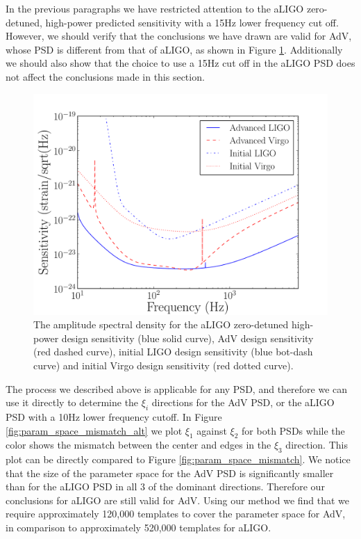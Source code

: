 In the previous paragraphs we have restricted attention to the aLIGO
zero-detuned, high-power predicted sensitivity with a 15Hz lower frequency cut off. However,
we should verify that the conclusions we have drawn are valid for AdV, whose
PSD is different from that of aLIGO, as shown in Figure \ref{fig:asd_comparison}. Additionally we
should also show that the choice to use a 15Hz cut off in the aLIGO PSD does not affect
the conclusions made in this section. 
\begin{figure}
\begin{center}
\includegraphics[width=1.0\textwidth]{papers/bns_spin/figure6.pdf}
\end{center}
\caption{\label{fig:asd_comparison} The amplitude spectral density for the aLIGO
zero-detuned high-power design sensitivity (blue solid curve), AdV design sensitivity
(red dashed curve), initial LIGO design sensitivity (blue bot-dash curve) and initial
Virgo design sensitivity (red dotted curve).}
\end{figure}


The process we described above is applicable for any PSD, and therefore we can use it directly
to determine the $\xi_i$ directions for the AdV PSD, or the aLIGO PSD with
a 10Hz lower frequency cutoff. In Figure \ref{fig:param_space_mismatch_alt} we plot
$\xi_1$ against $\xi_2$ for both PSDs while the color shows the mismatch between the center and edges in
the $\xi_3$ direction. This plot can be directly compared to Figure \ref{fig:param_space_mismatch}. We notice
that the size of the parameter space for the AdV PSD is significantly smaller than for the
aLIGO PSD in all 3 of the dominant directions. Therefore our conclusions for aLIGO are still
valid for AdV. Using our method we find that we require approximately 120,000 templates to cover the
parameter space for AdV, in comparison to approximately 520,000 templates for aLIGO. 

